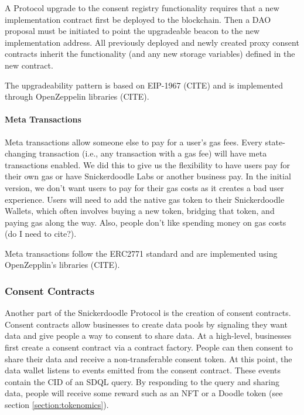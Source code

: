 A Protocol upgrade to the consent registry functionality requires that a new implementation contract first be deployed to the blockchain. Then a 
DAO proposal must be initiated to point the upgradeable beacon to the new implementation address. All previously deployed and newly created proxy 
consent contracts inherit the functionality (and any new storage variables) defined in the new contract.

The upgradeability pattern is based on EIP-1967 (CITE) and is implemented through OpenZeppelin libraries (CITE).

\paragraph{Meta Transactions}

Meta transactions allow someone else to pay for a user's gas fees. Every state-changing transaction (i.e., any transaction with a gas fee) will 
have meta transactions enabled. We did this to give us the flexibility to have users pay for their own gas or have Snickerdoodle Labs or another 
business pay. In the initial version, we don't want users to pay for their gas costs as it creates a bad user experience. Users will need to add 
the native gas token to their Snickerdoodle Wallets, which often involves buying a new token, bridging that token, and paying gas along the way. 
Also, people don't like spending money on gas costs (do I need to cite?). 

Meta transactions follow the ERC2771 standard and are implemented using OpenZepplin's libraries (CITE).

\subsubsection{Consent Contracts}
\label{section:ConsentContract}



Another part of the Snickerdoodle Protocol is the creation of consent contracts. Consent contracts allow businesses to create data pools by 
signaling they want data and give people a way to consent to share data. At a high-level, businesses first create a consent contract via a 
contract factory. People can then consent to share their data and receive a non-transferable consent token. At this point, the data wallet 
listens to events emitted from the consent contract. These events contain the CID of an SDQL query. By responding to the query and sharing 
data, people will receive some reward such as an NFT or a Doodle token (see section \ref{section:tokenomics}).


